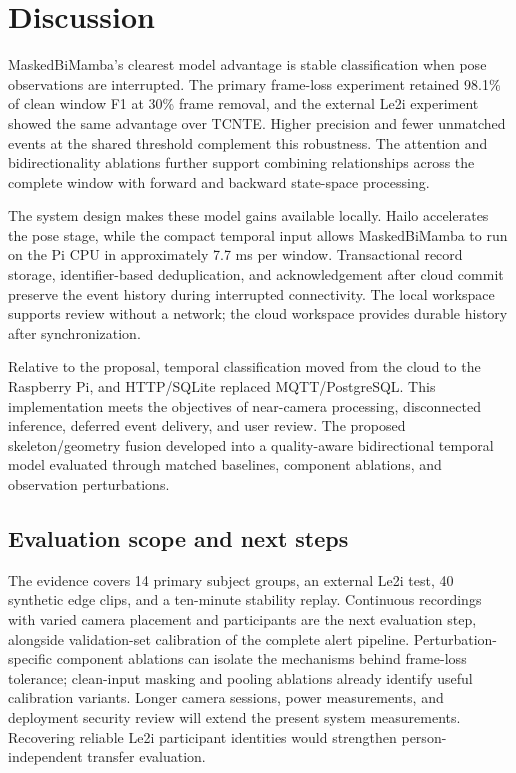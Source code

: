 \section{Discussion}

MaskedBiMamba's clearest model advantage is stable classification when pose observations are interrupted. The primary frame-loss experiment retained 98.1\% of clean window F1 at 30\% frame removal, and the external Le2i experiment showed the same advantage over TCNTE. Higher precision and fewer unmatched events at the shared threshold complement this robustness. The attention and bidirectionality ablations further support combining relationships across the complete window with forward and backward state-space processing.

The system design makes these model gains available locally. Hailo accelerates the pose stage, while the compact temporal input allows MaskedBiMamba to run on the Pi CPU in approximately 7.7 ms per window. Transactional record storage, identifier-based deduplication, and acknowledgement after cloud commit preserve the event history during interrupted connectivity. The local workspace supports review without a network; the cloud workspace provides durable history after synchronization.

Relative to the proposal, temporal classification moved from the cloud to the Raspberry Pi, and HTTP/SQLite replaced MQTT/PostgreSQL. This implementation meets the objectives of near-camera processing, disconnected inference, deferred event delivery, and user review. The proposed skeleton/geometry fusion developed into a quality-aware bidirectional temporal model evaluated through matched baselines, component ablations, and observation perturbations.

\subsection{Evaluation scope and next steps}

The evidence covers 14 primary subject groups, an external Le2i test, 40 synthetic edge clips, and a ten-minute stability replay. Continuous recordings with varied camera placement and participants are the next evaluation step, alongside validation-set calibration of the complete alert pipeline. Perturbation-specific component ablations can isolate the mechanisms behind frame-loss tolerance; clean-input masking and pooling ablations already identify useful calibration variants. Longer camera sessions, power measurements, and deployment security review will extend the present system measurements. Recovering reliable Le2i participant identities would strengthen person-independent transfer evaluation.
